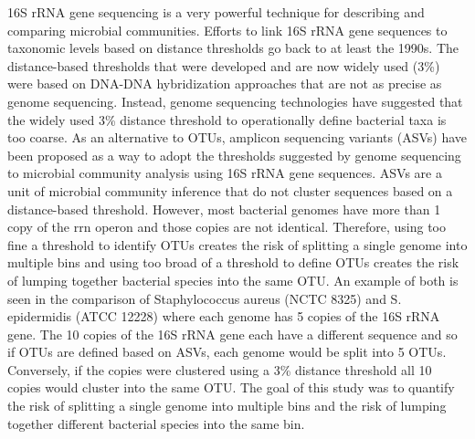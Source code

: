 \documentclass[
]{article}
\begin{document}
16S rRNA gene sequencing is a very powerful technique for describing and
comparing microbial communities. Efforts to link 16S rRNA gene sequences
to taxonomic levels based on distance thresholds go back to at least the
1990s. The distance-based thresholds that were developed and are now
widely used (3\%) were based on DNA-DNA hybridization approaches that
are not as precise as genome sequencing. Instead, genome sequencing
technologies have suggested that the widely used 3\% distance threshold
to operationally define bacterial taxa is too coarse. As an alternative
to OTUs, amplicon sequencing variants (ASVs) have been proposed as a way
to adopt the thresholds suggested by genome sequencing to microbial
community analysis using 16S rRNA gene sequences. ASVs are a unit of
microbial community inference that do not cluster sequences based on a
distance-based threshold. However, most bacterial genomes have more than
1 copy of the rrn operon and those copies are not identical. Therefore,
using too fine a threshold to identify OTUs creates the risk of
splitting a single genome into multiple bins and using too broad of a
threshold to define OTUs creates the risk of lumping together bacterial
species into the same OTU. An example of both is seen in the comparison
of Staphylococcus aureus (NCTC 8325) and S. epidermidis (ATCC 12228)
where each genome has 5 copies of the 16S rRNA gene. The 10 copies of
the 16S rRNA gene each have a different sequence and so if OTUs are
defined based on ASVs, each genome would be split into 5 OTUs.
Conversely, if the copies were clustered using a 3\% distance threshold
all 10 copies would cluster into the same OTU. The goal of this study
was to quantify the risk of splitting a single genome into multiple bins
and the risk of lumping together different bacterial species into the
same bin.
\end{document}
